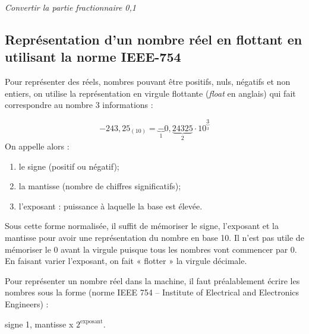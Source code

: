 %

\begin{exemple}
\textit{Convertir la partie fractionnaire 0,1}
\end{exemple}

\subsection{Représentation d'un nombre réel en flottant en utilisant la norme IEEE-754}

Pour représenter des réels, nombres pouvant être positifs, nuls, négatifs et non entiers, on utilise la représentation en virgule flottante (\textit{float} en anglais) qui fait correspondre au nombre 3 informations :

$$
-243,25_{(10)} = \underbrace{-}_{1}0,\underbrace{24325}_{2}\cdot10^{\underbrace{3}_{3}}
$$
On appelle alors : 
\begin{enumerate}
\item le signe (positif ou négatif);
\item la mantisse (nombre de chiffres significatifs);
\item l'exposant : puissance à laquelle la base est élevée. 
\end{enumerate}

Sous cette forme normalisée, il suffit de mémoriser le signe, l’exposant et la mantisse pour avoir une représentation du nombre en base 10. Il n’est pas utile de mémoriser le 0 avant la virgule puisque tous les nombres vont commencer par 0. En faisant varier l’exposant, on fait « flotter » la virgule décimale.

Pour représenter un nombre réel dans la machine, il faut préalablement écrire les nombres sous la forme (norme IEEE 754 -- Institute of Electrical and Electronics Engineers) :

\begin{center}
signe 1, mantisse x $2^{\text{exposant}}$.
\end{center}



